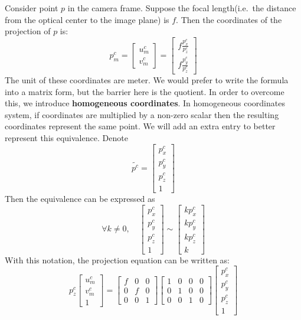 \documentclass[
]{book}
\theoremstyle{definition}
\theoremstyle{definition}
\theoremstyle{definition}
\theoremstyle{definition}
\theoremstyle{remark}
\begin{document}
Consider point \(p\) in the camera frame. Suppose the focal length(i.e.~the distance from the optical center to the image plane) is \(f\). Then the coordinates of the projection of \(p\) is:
\[p_m^c = \begin{bmatrix} u_m^c\\v_m^c \end{bmatrix} = \begin{bmatrix} f\frac{p^c_x}{p^c_z}\\ f\frac{p^c_y}{p^c_z} \end{bmatrix}\]
The unit of these coordinates are meter. We would prefer to write the formula into a matrix form, but the barrier here is the quotient. In order to overcome this, we introduce \textbf{homogeneous coordinates}. In homogeneous coordinates system, if coordinates are multiplied by a non-zero scalar then the resulting coordinates represent the same point. We will add an extra entry to better represent this equivalence. Denote \[\tilde{p^c} = \begin{bmatrix} p_x^c\\p_y^c\\p_z^c\\1 \end{bmatrix}\]
Then the equivalence can be expressed as \[\forall k\neq0  \text{,}\quad \ \begin{bmatrix} p_x^c\\p_y^c\\p_z^c\\1 \end{bmatrix} \sim \begin{bmatrix} kp_x^c\\kp_y^c\\kp_z^c\\k \end{bmatrix}\]
With this notation, the projection equation can be written as: \[p^c_z\begin{bmatrix} u_m^c\\v_m^c\\1 \end{bmatrix} = \begin{bmatrix} f &0 &0 \\ 0 &f &0\\ 0 &0 &1\end{bmatrix} \begin{bmatrix} 1 &0 &0 &0 \\ 0 &1 &0 &0\\ 0 &0 &1 &0\end{bmatrix} \begin{bmatrix} p_x^c\\p_y^c\\p_z^c\\1 \end{bmatrix}\]
\end{document}
